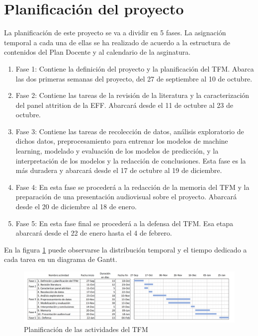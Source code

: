 \section{Planificación del proyecto}

La planificación de este proyecto se va a dividir en 5 fases. La asignación temporal a cada una de ellas se ha realizado de acuerdo a la estructura de contenidos del Plan Docente y al calendario de la asginatura.

\begin{enumerate}
    \item Fase 1: Contiene la definición del proyecto y la planificación del TFM. Abarca las dos primeras semanas del proyecto, del 27 de septiembre al 10 de octubre.
    \item Fase 2: Contiene las tareas de la revisión de la literatura y la caracterización del panel attrition de la EFF. Abarcará desde el 11 de octubre al 23 de octubre.
    \item Fase 3: Contiene las tareas de recolección de datos, análisis exploratorio de dichos datos, preprocesamiento para entrenar los modelos de machine learning, modelado y evaluación de los modelos de predicción, y la interpretación de los modelos y la redacción de conclusiones. Esta fase es la más duradera y abarcará desde el 17 de octubre al 19 de diciembre.
    \item Fase 4: En esta fase se procederá a la redacción de la memoria del TFM y la preparación de una presentación audiovisual sobre el proyecto. Abarcará desde el 20 de diciembre al 18 de enero.
    \item Fase 5: En esta fase final se procederá a la defensa del TFM. Esa etapa abarcará desde el 22 de enero hasta el 4 de febrero.
\end{enumerate}

 En la figura \ref{fig:gantt} puede observarse la distribución temporal y el tiempo dedicado a cada tarea en un diagrama de Gantt.


\begin{figure}
	\centering
	\includegraphics[width=1\textwidth]{figs/Gantt_diagram.png}
	\caption{Planificación de las actividades del TFM}
	\label{fig:gantt}
\end{figure}

